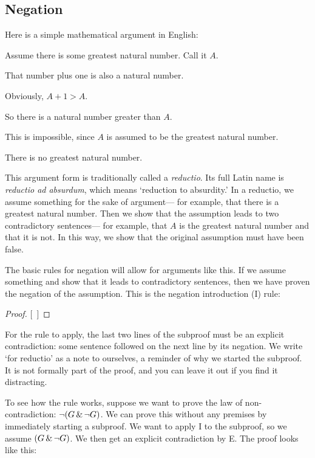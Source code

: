 \subsection{Negation}
Here is a simple mathematical argument in English:
\begin{earg}
\item[] Assume there is some greatest natural number. Call it $A$.
\item[] That number plus one is also a natural number.
\item[] Obviously, $A+1 > A$.
\item[] So there is a natural number greater than $A$.
\item[] This is impossible, since $A$ is assumed to be the greatest natural number.
\item[\therefore] There is no greatest natural number.
\end{earg}
This argument form is traditionally called a \emph{reductio}. Its full Latin name is \emph{reductio ad absurdum}, which means `reduction to absurdity.' In a reductio, we assume something for the sake of argument--- for example, that there is a greatest natural number. Then we show that the assumption leads to two contradictory sentences--- for example, that $A$ is the greatest natural number and that it is not. In this way, we show that the original assumption must have been false.

The basic rules for negation will allow for arguments like this. If we assume something and show that it leads to contradictory sentences, then we have proven the negation of the assumption. This is the negation introduction ({\enot}I) rule:

\begin{proof}
\open
\close
{}[\ ]{\enot{}}
\end{proof}

For the rule to apply, the last two lines of the subproof must be an explicit contradiction: some sentence followed on the next line by its negation. We write `for reductio' as a note to ourselves, a reminder of why we started the subproof. It is not formally part of the proof, and you can leave it out if you find it distracting.

To see how the rule works, suppose we want to prove the law of non-contradiction: $\neg(G \,\&\, \neg G)$. We can prove this without any premises by immediately starting a subproof. We want to apply {\enot}I to the subproof, so we assume $(G \,\&\, \neg G)$. We then get an explicit contradiction by {\eand}E. The proof looks like this:

